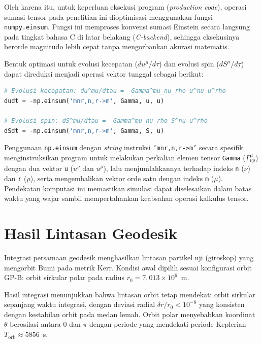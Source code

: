 Oleh karena itu, untuk keperluan eksekusi program (\textit{production code}), operasi sumasi tensor pada penelitian ini dioptimisasi menggunakan fungsi \texttt{numpy.einsum}. Fungsi ini memproses konvensi sumasi Einstein secara langsung pada tingkat bahasa C di latar belakang (\textit{C-backend}), sehingga eksekusinya berorde magnitudo lebih cepat tanpa mengorbankan akurasi matematis. 

Bentuk optimasi untuk evolusi kecepatan (\(du^\mu/d\tau\)) dan evolusi spin (\(dS^\mu/d\tau\)) dapat direduksi menjadi operasi vektor tunggal sebagai berikut:

\begin{lstlisting}[language=Python, caption={Optimasi operasi tensor menggunakan fungsi \texttt{numpy.einsum}.}, label={lst:einsum}]
# Evolusi kecepatan: du^mu/dtau = -Gamma^mu_nu_rho u^nu u^rho
dudt = -np.einsum('mnr,n,r->m', Gamma, u, u)

# Evolusi spin: dS^mu/dtau = -Gamma^mu_nu_rho S^nu u^rho
dSdt = -np.einsum('mnr,n,r->m', Gamma, S, u)
\end{lstlisting}

Penggunaan \texttt{np.einsum} dengan \textit{string} instruksi \texttt{'mnr,n,r->m'} secara spesifik menginstruksikan program untuk melakukan perkalian elemen tensor \texttt{Gamma} (\(\Gamma^\mu_{\nu\rho}\)) dengan dua vektor \texttt{u} (\(u^\nu\) dan \(u^\rho\)), lalu menjumlahkannya terhadap indeks \texttt{n} (\(\nu\)) dan \texttt{r} (\(\rho\)), serta mengembalikan vektor orde satu dengan indeks \texttt{m} (\(\mu\)). Pendekatan komputasi ini memastikan simulasi dapat diselesaikan dalam batas waktu yang wajar sambil mempertahankan keabsahan operasi kalkulus tensor.


\section{Hasil Lintasan Geodesik}
\label{sec:hasil-geodesik}

Integrasi persamaan geodesik menghasilkan lintasan partikel uji
(giroskop) yang mengorbit Bumi pada metrik Kerr.
Kondisi awal dipilih sesuai konfigurasi orbit GP-B:
orbit sirkular polar pada radius $r_0 = 7{,}013 \times 10^6$~m.

Hasil integrasi menunjukkan bahwa lintasan orbit tetap
mendekati orbit sirkular sepanjang waktu integrasi,
dengan deviasi radial $\delta r / r_0 < 10^{-8}$
yang konsisten dengan kestabilan orbit pada medan lemah.
Orbit polar menyebabkan koordinat $\theta$ berosilasi
antara $0$ dan $\pi$ dengan periode yang mendekati
periode Keplerian $T_{\text{orb}} \approx 5856$~s.

